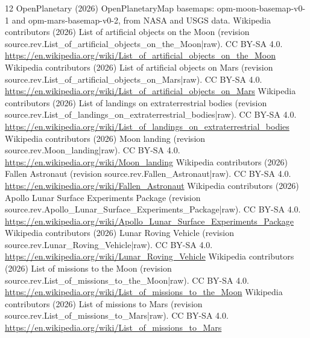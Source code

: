 \documentclass[11pt,a4paper]{article}
\begin{document}
\begin{thebibliography}{12}
 OpenPlanetary (2026) OpenPlanetaryMap basemaps: opm-moon-basemap-v0-1 and opm-mars-basemap-v0-2, from NASA and USGS data.
 Wikipedia contributors (2026) List of artificial objects on the Moon (revision {{source.rev.List_of_artificial_objects_on_the_Moon|raw}}). CC BY-SA 4.0. \url{https://en.wikipedia.org/wiki/List_of_artificial_objects_on_the_Moon}
 Wikipedia contributors (2026) List of artificial objects on Mars (revision {{source.rev.List_of_artificial_objects_on_Mars|raw}}). CC BY-SA 4.0. \url{https://en.wikipedia.org/wiki/List_of_artificial_objects_on_Mars}
 Wikipedia contributors (2026) List of landings on extraterrestrial bodies (revision {{source.rev.List_of_landings_on_extraterrestrial_bodies|raw}}). CC BY-SA 4.0. \url{https://en.wikipedia.org/wiki/List_of_landings_on_extraterrestrial_bodies}
 Wikipedia contributors (2026) Moon landing (revision {{source.rev.Moon_landing|raw}}). CC BY-SA 4.0. \url{https://en.wikipedia.org/wiki/Moon_landing}
 Wikipedia contributors (2026) Fallen Astronaut (revision {{source.rev.Fallen_Astronaut|raw}}). CC BY-SA 4.0. \url{https://en.wikipedia.org/wiki/Fallen_Astronaut}
 Wikipedia contributors (2026) Apollo Lunar Surface Experiments Package (revision {{source.rev.Apollo_Lunar_Surface_Experiments_Package|raw}}). CC BY-SA 4.0. \url{https://en.wikipedia.org/wiki/Apollo_Lunar_Surface_Experiments_Package}
 Wikipedia contributors (2026) Lunar Roving Vehicle (revision {{source.rev.Lunar_Roving_Vehicle|raw}}). CC BY-SA 4.0. \url{https://en.wikipedia.org/wiki/Lunar_Roving_Vehicle}
 Wikipedia contributors (2026) List of missions to the Moon (revision {{source.rev.List_of_missions_to_the_Moon|raw}}). CC BY-SA 4.0. \url{https://en.wikipedia.org/wiki/List_of_missions_to_the_Moon}
 Wikipedia contributors (2026) List of missions to Mars (revision {{source.rev.List_of_missions_to_Mars|raw}}). CC BY-SA 4.0. \url{https://en.wikipedia.org/wiki/List_of_missions_to_Mars}
\end{thebibliography}
\end{document}
